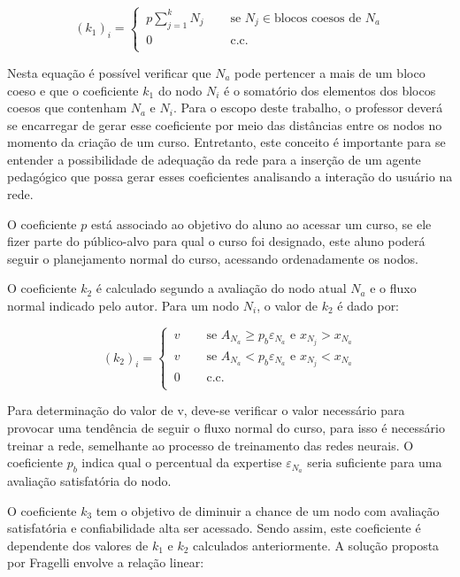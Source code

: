 \[
	(k_1)_i =	\left\{
	\begin{array}{ll}
	    \, p \sum_{j=1}^{k} N_j & \quad \text{ se } N_j \in \text{blocos coesos de } N_a  \\
		\, 0  & \quad \text{ c.c. } \\
  	\end{array}
  	\right.
\]

Nesta equação é possível verificar que \(N_a\) pode pertencer a mais de um bloco coeso e que o coeficiente \(k_1\) do nodo \(N_i\) é o somatório dos elementos dos blocos coesos que contenham \(N_a\) e \(N_i\). Para o escopo deste trabalho, o professor deverá se encarregar de gerar esse coeficiente por meio das distâncias entre os nodos no momento da criação de um curso. Entretanto, este conceito é importante para se entender a possibilidade de adequação da rede para a inserção de um agente pedagógico que possa gerar esses coeficientes analisando a interação do usuário na rede. 

O coeficiente \(p\) está associado ao objetivo do aluno ao acessar um curso, se ele fizer parte do público-alvo para qual o curso foi designado, este aluno poderá seguir o planejamento normal do curso, acessando ordenadamente os nodos.

O coeficiente \(k_2\) é calculado segundo a avaliação do nodo atual \(N_a\) e o fluxo normal indicado pelo autor. Para um nodo \(N_i\), o valor de \(k_2\) é dado por:

\[
	(k_2)_i =	\left\{
	\begin{array}{ll}
	    \, v 	& \quad \text{ se }  A_{N_a} \ge  p_b\varepsilon_{N_a}  \text{ e } x_{N_j} > x_{N_a}  \\
	    \, v 	& \quad \text{ se }  A_{N_a} < p_b\varepsilon_{N_a}  \text{ e } x_{N_j} < x_{N_a}  \\
	    	\, 0  	& \quad \text{ c.c. } \\
  	\end{array}
  	\right.
\]

Para determinação do valor de v, deve-se verificar o valor necessário para provocar uma tendência de seguir o fluxo normal do curso, para isso é necessário treinar a rede, semelhante ao processo de treinamento das redes neurais. O coeficiente \(p_b\) indica qual o percentual da expertise \(\varepsilon_{N_a}\) seria suficiente para uma avaliação satisfatória do nodo.

O coeficiente \(k_3\) tem o objetivo de diminuir a chance de um nodo com avaliação satisfatória e confiabilidade alta ser acessado. Sendo assim, este coeficiente é dependente dos valores de \(k_1\) e \(k_2\) calculados anteriormente. A solução proposta por Fragelli envolve a relação linear:


